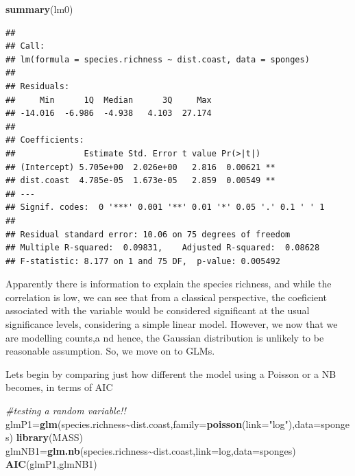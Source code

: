 \documentclass[
]{book}
\newenvironment{Shaded}{\begin{snugshade}}{\end{snugshade}}
\newcommand{\AttributeTok}[1]{\textcolor[rgb]{0.13,0.29,0.53}{#1}}
\newcommand{\CommentTok}[1]{\textcolor[rgb]{0.56,0.35,0.01}{\textit{#1}}}
\newcommand{\FunctionTok}[1]{\textcolor[rgb]{0.13,0.29,0.53}{\textbf{#1}}}
\newcommand{\NormalTok}[1]{#1}
\newcommand{\OtherTok}[1]{\textcolor[rgb]{0.56,0.35,0.01}{#1}}
\newcommand{\SpecialCharTok}[1]{\textcolor[rgb]{0.81,0.36,0.00}{\textbf{#1}}}
\newcommand{\StringTok}[1]{\textcolor[rgb]{0.31,0.60,0.02}{#1}}
\begin{document}
\begin{Shaded}
\begin{Highlighting}[]
\FunctionTok{summary}\NormalTok{(lm0)}
\end{Highlighting}
\end{Shaded}

\begin{verbatim}
## 
## Call:
## lm(formula = species.richness ~ dist.coast, data = sponges)
## 
## Residuals:
##     Min      1Q  Median      3Q     Max 
## -14.016  -6.986  -4.938   4.103  27.174 
## 
## Coefficients:
##              Estimate Std. Error t value Pr(>|t|)   
## (Intercept) 5.705e+00  2.026e+00   2.816  0.00621 **
## dist.coast  4.785e-05  1.673e-05   2.859  0.00549 **
## ---
## Signif. codes:  0 '***' 0.001 '**' 0.01 '*' 0.05 '.' 0.1 ' ' 1
## 
## Residual standard error: 10.06 on 75 degrees of freedom
## Multiple R-squared:  0.09831,    Adjusted R-squared:  0.08628 
## F-statistic: 8.177 on 1 and 75 DF,  p-value: 0.005492
\end{verbatim}

Apparently there is information to explain the species richness, and while the correlation is low, we can see that from a classical perspective, the coeficient associated with the variable would be considered significant at the usual significance levels, considering a simple linear model. However, we now that we are modelling counts,a nd hence, the Gaussian distribution is unlikely to be reasonable assumption. So, we move on to GLMs.

Lets begin by comparing just how different the model using a Poisson or a NB becomes, in terms of AIC

\begin{Shaded}
\begin{Highlighting}[]
\CommentTok{\#testing a random variable!!}
\NormalTok{glmP1}\OtherTok{=}\FunctionTok{glm}\NormalTok{(species.richness}\SpecialCharTok{\textasciitilde{}}\NormalTok{dist.coast,}\AttributeTok{family=}\FunctionTok{poisson}\NormalTok{(}\AttributeTok{link=}\StringTok{"log"}\NormalTok{),}\AttributeTok{data=}\NormalTok{sponges)}
\FunctionTok{library}\NormalTok{(MASS)}
\NormalTok{glmNB1}\OtherTok{=}\FunctionTok{glm.nb}\NormalTok{(species.richness}\SpecialCharTok{\textasciitilde{}}\NormalTok{dist.coast,}\AttributeTok{link=}\NormalTok{log,}\AttributeTok{data=}\NormalTok{sponges)}
\FunctionTok{AIC}\NormalTok{(glmP1,glmNB1)}
\end{Highlighting}
\end{Shaded}
\end{document}
